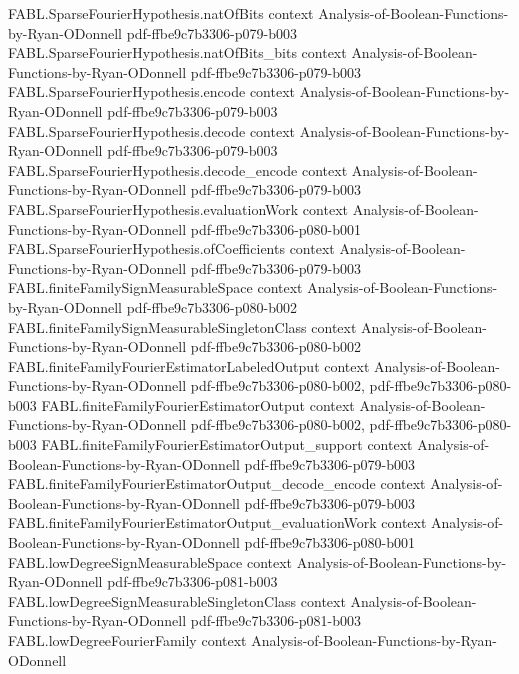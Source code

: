 \begin{theorem}
\proofstep
  {FABL.SparseFourierHypothesis.natOfBits}
  {context}
  {Analysis-of-Boolean-Functions-by-Ryan-ODonnell}
  {pdf-ffbe9c7b3306-p079-b003}
\proofstep
  {FABL.SparseFourierHypothesis.natOfBits_bits}
  {context}
  {Analysis-of-Boolean-Functions-by-Ryan-ODonnell}
  {pdf-ffbe9c7b3306-p079-b003}
\proofstep
  {FABL.SparseFourierHypothesis.encode}
  {context}
  {Analysis-of-Boolean-Functions-by-Ryan-ODonnell}
  {pdf-ffbe9c7b3306-p079-b003}
\proofstep
  {FABL.SparseFourierHypothesis.decode}
  {context}
  {Analysis-of-Boolean-Functions-by-Ryan-ODonnell}
  {pdf-ffbe9c7b3306-p079-b003}
\proofstep
  {FABL.SparseFourierHypothesis.decode_encode}
  {context}
  {Analysis-of-Boolean-Functions-by-Ryan-ODonnell}
  {pdf-ffbe9c7b3306-p079-b003}
\proofstep
  {FABL.SparseFourierHypothesis.evaluationWork}
  {context}
  {Analysis-of-Boolean-Functions-by-Ryan-ODonnell}
  {pdf-ffbe9c7b3306-p080-b001}
\proofstep
  {FABL.SparseFourierHypothesis.ofCoefficients}
  {context}
  {Analysis-of-Boolean-Functions-by-Ryan-ODonnell}
  {pdf-ffbe9c7b3306-p079-b003}
\proofstep
  {FABL.finiteFamilySignMeasurableSpace}
  {context}
  {Analysis-of-Boolean-Functions-by-Ryan-ODonnell}
  {pdf-ffbe9c7b3306-p080-b002}
\proofstep
  {FABL.finiteFamilySignMeasurableSingletonClass}
  {context}
  {Analysis-of-Boolean-Functions-by-Ryan-ODonnell}
  {pdf-ffbe9c7b3306-p080-b002}
\proofstep
  {FABL.finiteFamilyFourierEstimatorLabeledOutput}
  {context}
  {Analysis-of-Boolean-Functions-by-Ryan-ODonnell}
  {pdf-ffbe9c7b3306-p080-b002,
    pdf-ffbe9c7b3306-p080-b003}
\proofstep
  {FABL.finiteFamilyFourierEstimatorOutput}
  {context}
  {Analysis-of-Boolean-Functions-by-Ryan-ODonnell}
  {pdf-ffbe9c7b3306-p080-b002,
    pdf-ffbe9c7b3306-p080-b003}
\proofstep
  {FABL.finiteFamilyFourierEstimatorOutput_support}
  {context}
  {Analysis-of-Boolean-Functions-by-Ryan-ODonnell}
  {pdf-ffbe9c7b3306-p079-b003}
\proofstep
  {FABL.finiteFamilyFourierEstimatorOutput_decode_encode}
  {context}
  {Analysis-of-Boolean-Functions-by-Ryan-ODonnell}
  {pdf-ffbe9c7b3306-p079-b003}
\proofstep
  {FABL.finiteFamilyFourierEstimatorOutput_evaluationWork}
  {context}
  {Analysis-of-Boolean-Functions-by-Ryan-ODonnell}
  {pdf-ffbe9c7b3306-p080-b001}
\proofstep
  {FABL.lowDegreeSignMeasurableSpace}
  {context}
  {Analysis-of-Boolean-Functions-by-Ryan-ODonnell}
  {pdf-ffbe9c7b3306-p081-b003}
\proofstep
  {FABL.lowDegreeSignMeasurableSingletonClass}
  {context}
  {Analysis-of-Boolean-Functions-by-Ryan-ODonnell}
  {pdf-ffbe9c7b3306-p081-b003}
\proofstep
  {FABL.lowDegreeFourierFamily}
  {context}
  {Analysis-of-Boolean-Functions-by-Ryan-ODonnell}

\end{theorem}
